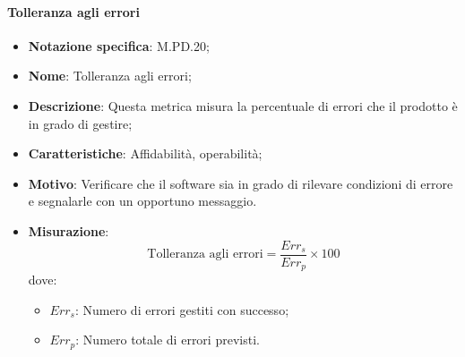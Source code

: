 \paragraph*{Tolleranza agli errori}
\begin{itemize}
    \item \textbf{Notazione specifica}: M.PD.20;
    \item \textbf{Nome}: Tolleranza agli errori;
    \item \textbf{Descrizione}: Questa metrica misura la percentuale di errori che il prodotto è in grado di gestire;
    \item \textbf{Caratteristiche}: Affidabilità, operabilità;
    \item \textbf{Motivo}: Verificare che il software sia in grado di rilevare condizioni di errore e segnalarle con un opportuno messaggio.
    \item \textbf{Misurazione}:
    \[
        \text{Tolleranza agli errori} = \frac{Err_{s}}{Err_{p}} \times 100
    \]
    dove:
    \begin{itemize}
        \item $Err_{s}$: Numero di errori gestiti con successo;
        \item $Err_{p}$: Numero totale di errori previsti.
    \end{itemize}
\end{itemize}
